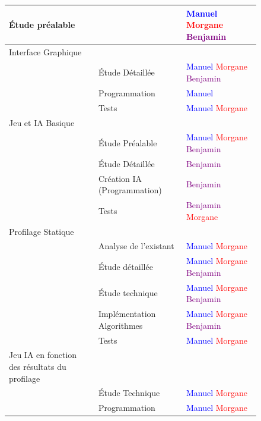 \documentclass{report}
\begin{document}
		\begin{figure}[h]
			\hspace{-1.5cm}	\begin{tabular}{|l|l|l|}
				\hline
				Étude préalable & & \textcolor{blue}{Manuel}  \textcolor{red}{Morgane}  \textcolor{purple}{Benjamin}\\ 
				\hline
  				 Interface Graphique & &  \\
  				 \hline
  				 & Étude Détaillée &  \textcolor{blue}{Manuel}  \textcolor{red}{Morgane}  \textcolor{purple}{Benjamin}\\
  				 \hline
  				 & Programmation & \textcolor{blue}{Manuel}\\
  				 \hline
  				 & Tests & \textcolor{blue}{Manuel}  \textcolor{red}{Morgane}\\
  				 \hline
  				 Jeu et IA Basique & & \\
  				 \hline
  				 & Étude Préalable & \textcolor{blue}{Manuel}  \textcolor{red}{Morgane}  \textcolor{purple}{Benjamin}\\
  				 \hline
  				 & Étude Détaillée & \textcolor{purple}{Benjamin}\\
  				 \hline
  				 & Création IA (Programmation) & \textcolor{purple}{Benjamin}\\
  				 \hline
  				 & Tests & \textcolor{purple}{Benjamin} \textcolor{red}{Morgane}\\
  				 \hline
  				 Profilage Statique & &\\
  				 \hline
  				 & Analyse de l'existant & \textcolor{blue}{Manuel}  \textcolor{red}{Morgane} \\
  				 \hline
  				 & Étude détaillée & \textcolor{blue}{Manuel}  \textcolor{red}{Morgane}  \textcolor{purple}{Benjamin}\\
  				 \hline
  				 & Étude technique & \textcolor{blue}{Manuel}  \textcolor{red}{Morgane}  \textcolor{purple}{Benjamin}\\
  				 \hline
  				 & Implémentation Algorithmes & \textcolor{blue}{Manuel}  \textcolor{red}{Morgane}  \textcolor{purple}{Benjamin}\\
  				 \hline
  				 & Tests & \textcolor{blue}{Manuel}  \textcolor{red}{Morgane} \\
  				 \hline
  				 Jeu IA en fonction des résultats du profilage & &\\
  				 \hline
  				 & Étude Technique & \textcolor{blue}{Manuel}  \textcolor{red}{Morgane} \\
  				 \hline
  				 & Programmation & \textcolor{blue}{Manuel}  \textcolor{red}{Morgane} \\

\end{tabular}
\end{figure}
\end{document}
